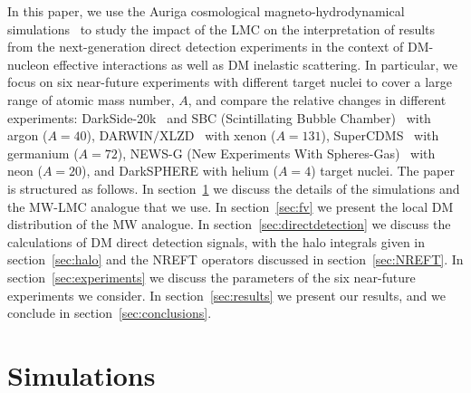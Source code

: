 \documentclass[a4paper,11pt]{article}
\begin{document}
In this paper, we use the Auriga cosmological magneto-hydrodynamical simulations~\cite{Grand:2016mgo} to study the impact of the LMC on the interpretation of results from the next-generation direct detection experiments in the context of DM-nucleon effective interactions as well as DM inelastic scattering. In particular, we focus on six near-future experiments with different target nuclei to cover a large range of atomic mass number, $A$, and compare the relative changes in different experiments: DarkSide-20k~\cite{DarkSide-20k:2017zyg} and SBC (Scintillating Bubble Chamber)~\cite{Alfonso-Pita:2023frp} with argon ($A = 40$), DARWIN$\slash$XLZD~\cite{Schumann:2015cpa, Aalbers:2022dzr, Baudis:2024jnk} with xenon ($A = 131$), SuperCDMS~\cite{SuperCDMS:2016wui} with germanium ($A = 72$), NEWS-G (New Experiments With Spheres-Gas)~\cite{NEWS-G:2017pxg, Durnford:2021mzg} with neon ($A = 20$), and DarkSPHERE \cite{NEWS-G:2023qwh} with helium ($A = 4$) target nuclei. The paper is structured as follows. In section~\ref{sec:sims} we discuss the details of the simulations and the MW-LMC analogue that we use. In section~\ref{sec:fv} we present the local DM distribution of the MW analogue. In section~\ref{sec:directdetection} we discuss the calculations of DM direct detection signals, with the halo integrals given in section~\ref{sec:halo} and the NREFT operators discussed in section~\ref{sec:NREFT}. In section~\ref{sec:experiments} we discuss the parameters of the six near-future experiments we consider. In section~\ref{sec:results} we present our results, and we conclude in section~\ref{sec:conclusions}.



\section{Simulations}
\label{sec:sims}
\end{document}
